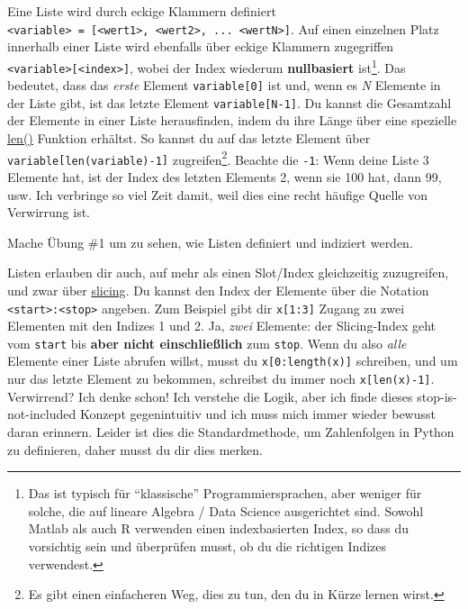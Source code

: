 \documentclass[
]{book}
\begin{document}
Eine Liste wird durch eckige Klammern definiert \texttt{\textless{}variable\textgreater{}\ =\ {[}\textless{}wert1\textgreater{},\ \textless{}wert2\textgreater{},\ ...\ \textless{}wertN\textgreater{}{]}}. Auf einen einzelnen Platz innerhalb einer Liste wird ebenfalls über eckige Klammern zugegriffen \texttt{\textless{}variable\textgreater{}{[}\textless{}index\textgreater{}{]}}, wobei der Index wiederum \textbf{nullbasiert} ist\footnote{Das ist typisch für ``klassische'' Programmiersprachen, aber weniger für solche, die auf lineare Algebra / Data Science ausgerichtet sind. Sowohl Matlab als auch R verwenden einen indexbasierten Index, so dass du vorsichtig sein und überprüfen musst, ob du die richtigen Indizes verwendest.}. Das bedeutet, dass das \emph{erste} Element \texttt{variable{[}0{]}} ist und, wenn es \emph{N} Elemente in der Liste gibt, ist das letzte Element \texttt{variable{[}N-1{]}}. Du kannst die Gesamtzahl der Elemente in einer Liste herausfinden, indem du ihre Länge über eine spezielle \href{https://docs.python.org/3/library/functions.html\#len}{len()} Funktion erhältst. So kannst du auf das letzte Element über \texttt{variable{[}len(variable)-1{]}} zugreifen\footnote{Es gibt einen einfacheren Weg, dies zu tun, den du in Kürze lernen wirst.}. Beachte die \texttt{-1}: Wenn deine Liste 3 Elemente hat, ist der Index des letzten Elements 2, wenn sie 100 hat, dann 99, usw. Ich verbringe so viel Zeit damit, weil dies eine recht häufige Quelle von Verwirrung ist.

Mache Übung \#1 um zu sehen, wie Listen definiert und indiziert werden.

Listen erlauben dir auch, auf mehr als einen Slot/Index gleichzeitig zuzugreifen, und zwar über \href{https://docs.python.org/3/library/functions.html\#slice}{slicing}. Du kannst den Index der Elemente über die Notation \texttt{\textless{}start\textgreater{}:\textless{}stop\textgreater{}} angeben. Zum Beispiel gibt dir \texttt{x{[}1:3{]}} Zugang zu zwei Elementen mit den Indizes 1 und 2. Ja, \emph{zwei} Elemente: der Slicing-Index geht vom \texttt{start} bis \textbf{aber nicht einschließlich} zum \texttt{stop}. Wenn du also \emph{alle} Elemente einer Liste abrufen willst, musst du \texttt{x{[}0:length(x){]}} schreiben, und um nur das letzte Element zu bekommen, schreibst du immer noch \texttt{x{[}len(x)-1{]}}. Verwirrend? Ich denke schon! Ich verstehe die Logik, aber ich finde dieses stop-is-not-included Konzept gegenintuitiv und ich muss mich immer wieder bewusst daran erinnern. Leider ist dies die Standardmethode, um Zahlenfolgen in Python zu definieren, daher musst du dir dies merken.
\end{document}
